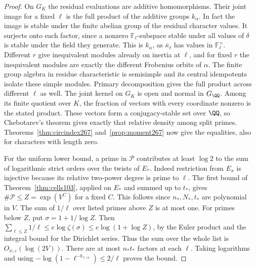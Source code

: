 \documentclass[a4paper,11pt]{article}
\theoremstyle{definition}
\theoremstyle{remark}
\numberwithin{equation}{section}
\begin{document}
\begin{proof}
On \(G_K\) the residual evaluations are additive homomorphisms.
Their joint image for a fixed \(\ell\) is the full product of
the additive groups \(k_\alpha\). In fact the image is stable
under the finite abelian group of the residual character values.
It surjects onto each factor, since a nonzero
\(\mathbb F_\ell\)-subspace stable under all values of \(\delta\)
is stable under the field they generate. This is \(k_\alpha\),
as \(\bar\kappa_\ell\) has values in \(\mathbb F_\ell^\times\).
Different \(r\) give inequivalent modules already on inertia at
\(\ell\), and for fixed \(r\) the inequivalent modules are exactly
the different Frobenius orbits of \(\alpha\). The finite group
algebra in residue characteristic is semisimple and its central
idempotents isolate these simple modules. Primary decomposition
gives the full product across different \(\ell\) as well.
The joint kernel on \(G_K\) is open and normal in \(G_\QQ\).
Among its finite quotient over \(K\), the fraction of vectors
with every coordinate nonzero is the stated product. These
vectors form a conjugacy-stable set over \(\QQ\), so Chebotarev's
theorem gives exactly that relative density among split primes.
Theorems~\ref{thm:circindex267} and~\ref{prop:moment267} now
give the equalities, also for characters with length zero.

For the uniform lower bound, a prime in \(\mathcal P\) contributes
at least \(\log 2\) to the sum of logarithmic strict orders over
the twists of \(E_*\). Indeed restriction from \(E_x\) is
injective because its relative two-power degree is prime to
\(\ell\). The first bound of Theorem~\ref{thm:cells103}, applied
on \(E_*\) and summed up to \(t_*\), gives
\(\#\mathcal P\le Z=\exp(V^C)\) for a fixed \(C\). This follows
since \(n_*,N_*,t_*\) are polynomial in \(V\).
The sum of \(1/\ell\) over listed primes above \(Z\) is at most
one. For primes below \(Z\), put \(\sigma=1+1/\log Z\).
Then \(\sum_{\ell\le Z}1/\ell\le e\log\zeta(\sigma)
\le e\log(1+\log Z)\), by the Euler product and the integral
bound for the Dirichlet series. Thus the sum over the whole
list is \(O_{\psi,\varepsilon}(\log(2V))\).
There are at most \(n_*t_*\) factors at each \(\ell\).
Taking logarithms and using
\(-\log(1-\ell^{-b_{\ell,\alpha}})\le2/\ell\)
proves the bound.
\end{proof}
\end{document}
